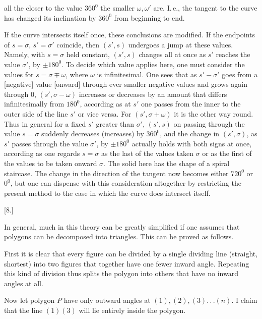 %
all the closer to the value $360^0$ the smaller $\omega, \omega'$ are. I.\,e., the tangent to the curve has changed its inclination by $360^0$ from beginning to end.

If the curve intersects itself once, these conclusions are modified. If the endpoints of $s = \sigma$, $s' = \sigma'$ coincide, then $(s', s)$ undergoes a jump at these values. Namely, with $s = \sigma$ held constant, $(s', s)$ changes all at once as $s'$ reaches the value $\sigma'$, by $\pm 180^0$. To decide which value applies here, one must consider the values for $s = \sigma \mp \omega$, where $\omega$ is infinitesimal. One sees that as $s' - \sigma'$ goes from a [negative] value [onward] through ever smaller negative values and grows again through $0$, $(s', \sigma - \omega)$ increases or decreases by an amount that differs infinitesimally from $180^0$, according as at $s'$ one passes from the inner to the outer side of the line $s'$ or vice versa. For $(s', \sigma + \omega)$ it is the other way round. Thus in general for a fixed $s'$ greater than $\sigma'$, $(s', s)$ on passing through the value $s = \sigma$ suddenly decreases (increases) by $360^0$, and the change in $(s', \sigma)$, as $s'$ passes through the value $\sigma'$, by $\pm 180^0$ actually holds with both signs at once, according as one regards $s = \sigma$ as the last of the values taken  $\sigma$ or as the first of the values to be taken onward  $\sigma$. The solid here has the shape of a spiral staircase. The change in the direction of the tangent now becomes either $720^0$ or $0^0$, but one can dispense with this consideration altogether by restricting the present method to the case in which the curve does  intersect itself.

\begin{center}
[8.]
\end{center}

In general, much in this theory can be greatly simplified if one assumes that polygons can be decomposed into triangles. This can be proved as follows.

First it is clear that every figure can be divided by a single dividing line (straight, shortest) into two figures that together have one fewer inward angle. Repeating this kind of division thus splits the polygon into others that have no inward angles at all.

Now let polygon $P$ have only outward angles at $(1), (2), (3) .\,.\,. (n)$. I claim that the line $(1)(3)$ will lie entirely inside the polygon.
